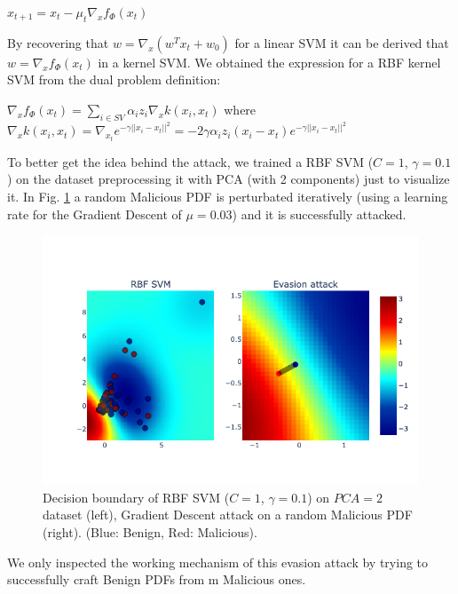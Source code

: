 \documentclass[twocolumn, switch]{article} %
\newcommand\x{0.7}
\begin{document}
\begin{center}
	$x_{t+1} = x_t - \mu_t\nabla_xf_{\Phi}(x_t)$
\end{center}
By recovering that $w = \nabla_x(w^Tx_t+w_0)$ for a linear SVM it can be derived that $w = \nabla_xf_{\Phi}(x_t)$ in a kernel SVM.
We obtained the expression for a RBF kernel SVM from the dual problem definition:
\begin{center}
	$\nabla_xf_{\Phi}(x_t) = \sum_{i \in SV}^{}\alpha_iz_i\nabla_xk(x_i,x_t)$
	where $\nabla_xk(x_i,x_t) = \nabla_{x_t}e^{-\gamma||x_i-x_t||^2}=-2\gamma\alpha_i z_i(x_i - x_t)e^{-\gamma||x_i-x_t||^2}$
\end{center}
To better get the idea behind the attack, we trained a RBF SVM ($C=1$, $\gamma=0.1$) on the dataset preprocessing it with PCA (with 2 components) just to visualize it. In Fig. \ref{fig:svmattack} a random Malicious PDF is perturbated iteratively (using a learning rate for the Gradient Descent of $\mu=0.03$) and it is successfully attacked.
\begin{figure}[ht!]
	\centering
	\includegraphics[width=\x\linewidth]{svmattack.png}
	\caption{Decision boundary of RBF SVM ($C=1$, $\gamma=0.1$) on $PCA=2$ dataset (left), Gradient Descent attack on a random Malicious PDF (right). (Blue: Benign, Red: Malicious).}
	\label{fig:svmattack}
	\vspace{-5mm}
\end{figure}
We only inspected the working mechanism of this evasion attack by trying to successfully craft Benign PDFs from m
Malicious ones.
\end{document}
